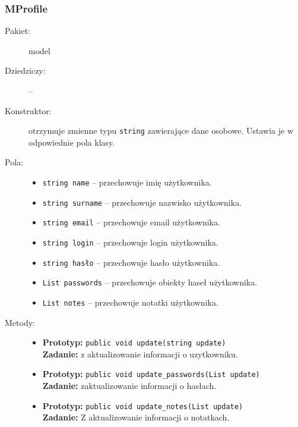 \documentclass[a4paper]{article}
\newcommand{\prog}{\texttt}
\begin{document}
\subsubsection{MProfile}
\begin{description}
    \item[Pakiet:] model
    \item[Dziedziczy:] --
    \item[Konstruktor:] otrzymuje zmienne typu \prog{string} zawierające dane osobowe. Ustawia je w odpowiednie pola klasy.
    \item[Pola:] \hfill
    \begin{itemize}
        \item \prog{string name} -- przechowuje imię użytkownika.
        \item \prog{string surname} -- przechowuje nazwisko użytkownika.
        \item \prog{string email} -- przechowuje email użytkownika.
        \item \prog{string login} -- przechowuje login użytkownika.
        \item \prog{string hasło} -- przechowuje hasło użytkownika.
        \item \prog{List passwords} -- przechowuje obiekty haseł użytkownika.
        \item \prog{List notes} -- przechowuje notatki użytkownika.
    \end{itemize}
    \item[Metody:] \hfill
    \begin{itemize}
        \item \textbf{Prototyp:} \prog{public void update(string update)}\\\textbf{Zadanie:} z aktualizowanie informacji o uzytkowniku.
        \item \textbf{Prototyp:} \prog{public void update\_passwords(List update)}\\\textbf{Zadanie:} zaktualizowanie informacji o hasłach.
        \item \textbf{Prototyp:} \prog{public void update\_notes(List update)}\\\textbf{Zadanie:} Z aktualizowanie informacji o notatkach.
    \end{itemize}
\end{description}
\end{document}
